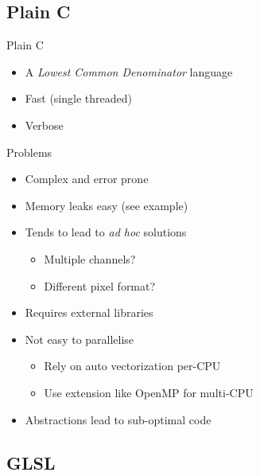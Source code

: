 \documentclass{beamer}
\newcommand{\bi}{\begin{itemize}}
\newcommand{\ei}{\end{itemize}}
\begin{document}
\subsection{Plain C} %

\begin{frame}{Plain C}
  \bi
  
  \item A \emph{Lowest Common Denominator} language

  \item Fast (single threaded)

  \item Verbose

  \ei
\end{frame}

\begin{frame}



\end{frame}

\begin{frame}{Problems}
  \bi
  
  \item Complex and error prone

  \item Memory leaks easy (see example)

  \item Tends to lead to \emph{ad hoc} solutions
  \bi
    \item Multiple channels?
    \item Different pixel format?
  \ei

  \item Requires external libraries

  \item Not easy to parallelise
  \bi
    \item Rely on auto vectorization per-CPU
    \item Use extension like OpenMP for multi-CPU 
  \ei

  \item Abstractions lead to sub-optimal code

  \ei
\end{frame}


\subsection{GLSL} %
\end{document}
